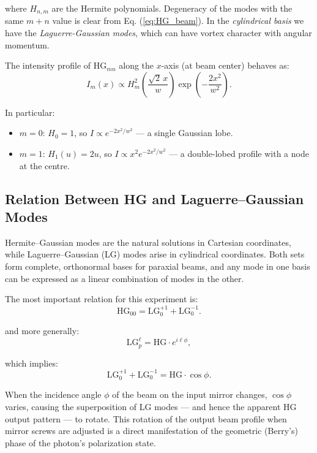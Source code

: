 where $H_{n,m}$ are the Hermite polynomials. Degeneracy of the modes with the same $m + n$ value is clear from Eq. (\ref{eq:HG_beam}). In the \emph{cylindrical basis} we have the \emph{Laguerre-Gaussian modes}, which can have vortex character with angular momentum.


The intensity profile of $\mathrm{HG}_{mn}$ along the $x$-axis (at beam center) behaves as:
\begin{equation}
I_m(x) \propto H_m^2\left( \frac{\sqrt{2}\,x}{w} \right)
\exp\left( -\frac{2x^2}{w^2} \right).
\end{equation}

In particular:
\begin{itemize}
\item $m = 0$: $H_0 = 1$, so $I \propto e^{-2x^2/w^2}$ --- a single Gaussian lobe.
\item $m = 1$: $H_1(u) = 2u$, so $I \propto x^2 e^{-2x^2/w^2}$ --- a double-lobed profile with a node at the centre.
\end{itemize}

\subsection{Relation Between HG and Laguerre--Gaussian Modes}

Hermite--Gaussian modes are the natural solutions in Cartesian coordinates, while Laguerre--Gaussian (LG) modes arise in cylindrical coordinates. Both sets form complete, orthonormal bases for paraxial beams, and any mode in one basis can be expressed as a linear combination of modes in the other.

The most important relation for this experiment is:
\begin{equation}
\mathrm{HG}_{00} = \mathrm{LG}_{0}^{+1} + \mathrm{LG}_{0}^{-1}.
\end{equation}

and more generally:
\begin{equation}
\mathrm{LG}_{p}^{\ell} = \mathrm{HG} \cdot e^{i\ell\phi},
\end{equation}

which implies:
\begin{equation}
\mathrm{LG}_{0}^{+1} + \mathrm{LG}_{0}^{-1}
= \mathrm{HG} \cdot \cos\phi.
\end{equation}

When the incidence angle $\phi$ of the beam on the input mirror changes,
$\cos\phi$ varies, causing the superposition of LG modes --- and hence the apparent HG output pattern --- to rotate. This rotation of the output beam profile when mirror screws are adjusted is a direct manifestation of the geometric (Berry's) phase of the photon's polarization state.

